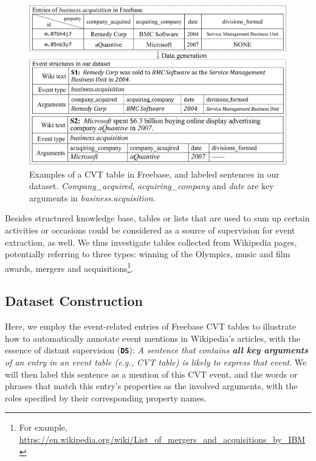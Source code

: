 \begin{figure}[h]
	\centering
	\includegraphics[width=.48\textwidth]{figure1.png}
	\caption{Examples of a CVT table in Freebase, and labeled sentences in our dataset. \emph{Company\_acquired}, \emph{acquiring\_company} and \emph{date} are key arguments in \emph{business.acquisition}. \label{fig:3}}
\end{figure}

Besides structured knowledge base, tables or lists that are used to sum up certain activities or occasions could be considered as a source of supervision for event extraction, as well.
We thus investigate tables collected from Wikipedia pages, potentially referring to three types: winning of the Olympics, music and film awards, mergers and acquisitions\footnote{For example, \url{https://en.wikipedia.org/wiki/List_of_mergers_and_acquisitions_by_IBM}}.

\subsection{Dataset Construction\label{datagen}}
Here, we employ the event-related entries of Freebase CVT tables to illustrate how to automatically annotate event mentions in Wikipedia's articles, with the essence of distant supervision (\textbf{\texttt{DS}}): \textit{A sentence that contains \textbf{all key arguments} of an entry in an event table (e.g., CVT table) is likely to express that event}.
We will then label this sentence as a mention of this CVT event, and the words or phrases that match this entry's properties as the involved arguments, with the roles specified by their corresponding property names.

